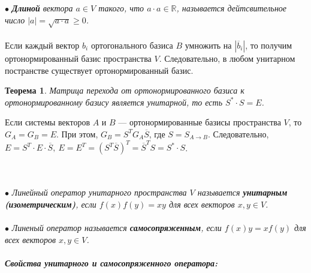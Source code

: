 $\bullet$ \textit{\textbf{Длиной} вектора $a\in V$ такого, что $a\cdot a \in \mathbb{R}$, называется дейтсвительное число $|a|=\sqrt{a \cdot a}\geqslant0$.}\\\\
Если каждый вектор $b_i$ ортогонального базиса $B$ умножить на $|\overline{b}_i|$, то получим ортонормированный базис пространства $V$. Следовательно, в любом унитарном постранстве существует ортонормированный базис.
\newtheorem*{th14_9_2}{Теорема}\begin{th14_9_2}Матрица перехода от ортонормированного базиса к ортонормированному базису является унитарной, то есть $S^*\cdot S=E$.
\end{th14_9_2}\begin{Proof}
	Если системы векторов $A$ и $B$ --- ортонормированные базисы пространства $V$, то $G_A=G_B=E$. При этом, $G_B = S^T G_A \overline{S}$, где $S=S_{A\rightarrow B}$. Следовательно, $E = S^T \cdot E \cdot \overline{S},\ E = E^T =  (S^T\overline{S})^T=\overline{S}^TS=S^*\cdot S$.
\end{Proof}\\\\
$\bullet$ \textit{Линейный оператор унитарного пространства $V$ называется \textbf{унитарным (изометрическим)}, если  $f(x)f(y)=xy$ для всех векторов $x,y \in V$. }\\\\
$\bullet$ \textit{Линеный оператор называется \textbf{самосопряженным}, если $f(x)y = xf(y)$ для всех векторов $x,y \in V$. }\\\\
\textit{ \textbf{Свойства унитарного и самосопряженного оператора:}}
